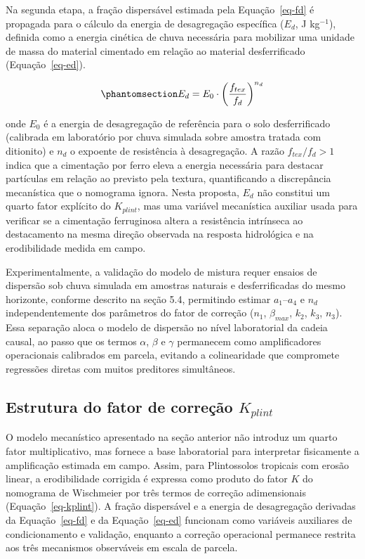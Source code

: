 \documentclass[
  brazilian,
  authoryear,
  preprint]{elsarticle}
\begin{document}
Na segunda etapa, a fração dispersável estimada pela Equação~\ref{eq-fd}
é propagada para o cálculo da energia de desagregação específica
(\(E_d\), J kg\(^{-1}\)), definida como a energia cinética de chuva
necessária para mobilizar uma unidade de massa do material cimentado em
relação ao material desferrificado (Equação~\ref{eq-ed}).

\begin{equation}\phantomsection\label{eq-ed}{
E_d = E_0 \cdot \left(\dfrac{f_{tex}}{f_d}\right)^{n_d}
}\end{equation}

onde \(E_0\) é a energia de desagregação de referência para o solo
desferrificado (calibrada em laboratório por chuva simulada sobre
amostra tratada com ditionito) e \(n_d\) o expoente de resistência à
desagregação. A razão \(f_{tex}/f_d > 1\) indica que a cimentação por
ferro eleva a energia necessária para destacar partículas em relação ao
previsto pela textura, quantificando a discrepância mecanística que o
nomograma ignora. Nesta proposta, \(E_d\) não constitui um quarto fator
explícito do \(K_{plint}\), mas uma variável mecanística auxiliar usada
para verificar se a cimentação ferruginosa altera a resistência
intrínseca ao destacamento na mesma direção observada na resposta
hidrológica e na erodibilidade medida em campo.

Experimentalmente, a validação do modelo de mistura requer ensaios de
dispersão sob chuva simulada em amostras naturais e desferrificadas do
mesmo horizonte, conforme descrito na seção 5.4, permitindo estimar
\(a_1\)--\(a_4\) e \(n_d\) independentemente dos parâmetros do fator de
correção (\(n_1\), \(\beta_{max}\), \(k_2\), \(k_3\), \(n_3\)). Essa
separação aloca o modelo de dispersão no nível laboratorial da cadeia
causal, ao passo que os termos \(\alpha\), \(\beta\) e \(\gamma\)
permanecem como amplificadores operacionais calibrados em parcela,
evitando a colinearidade que compromete regressões diretas com muitos
preditores simultâneos.

\subsection{\texorpdfstring{Estrutura do fator de correção
\(K_{plint}\)}{Estrutura do fator de correção K\_\{plint\}}}\label{estrutura-do-fator-de-correuxe7uxe3o-k_plint}

O modelo mecanístico apresentado na seção anterior não introduz um
quarto fator multiplicativo, mas fornece a base laboratorial para
interpretar fisicamente a amplificação estimada em campo. Assim, para
Plintossolos tropicais com erosão linear, a erodibilidade corrigida é
expressa como produto do fator \(K\) do nomograma de Wischmeier por três
termos de correção adimensionais (Equação~\ref{eq-kplint}). A fração
dispersável e a energia de desagregação derivadas da Equação~\ref{eq-fd}
e da Equação~\ref{eq-ed} funcionam como variáveis auxiliares de
condicionamento e validação, enquanto a correção operacional permanece
restrita aos três mecanismos observáveis em escala de parcela.
\end{document}
